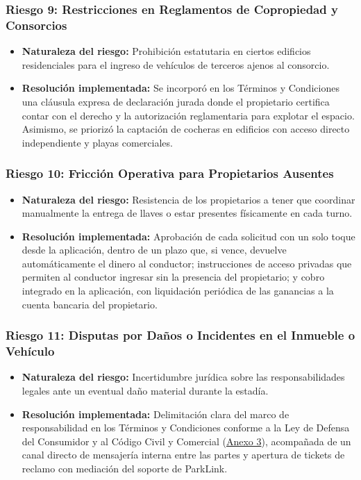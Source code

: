 \subsubsection{Riesgo 9: Restricciones en Reglamentos de Copropiedad y Consorcios}
\begin{itemize}
    \item \textbf{Naturaleza del riesgo:} Prohibición estatutaria en ciertos edificios residenciales para el ingreso de vehículos de terceros ajenos al consorcio.
    \item \textbf{Resolución implementada:} Se incorporó en los Términos y Condiciones una cláusula expresa de declaración jurada donde el propietario certifica contar con el derecho y la autorización reglamentaria para explotar el espacio. Asimismo, se priorizó la captación de cocheras en edificios con acceso directo independiente y playas comerciales.
\end{itemize}

\subsubsection{Riesgo 10: Fricción Operativa para Propietarios Ausentes}
\begin{itemize}
    \item \textbf{Naturaleza del riesgo:} Resistencia de los propietarios a tener que coordinar manualmente la entrega de llaves o estar presentes físicamente en cada turno.
    \item \textbf{Resolución implementada:} Aprobación de cada solicitud con un solo toque desde la aplicación, dentro de un plazo que, si vence, devuelve automáticamente el dinero al conductor; instrucciones de acceso privadas que permiten al conductor ingresar sin la presencia del propietario; y cobro integrado en la aplicación, con liquidación periódica de las ganancias a la cuenta bancaria del propietario.
\end{itemize}

\subsubsection{Riesgo 11: Disputas por Daños o Incidentes en el Inmueble o Vehículo}
\begin{itemize}
    \item \textbf{Naturaleza del riesgo:} Incertidumbre jurídica sobre las responsabilidades legales ante un eventual daño material durante la estadía.
    \item \textbf{Resolución implementada:} Delimitación clara del marco de responsabilidad en los Términos y Condiciones conforme a la Ley de Defensa del Consumidor y al Código Civil y Comercial (\hyperref[anexo:legal]{Anexo 3}), acompañada de un canal directo de mensajería interna entre las partes y apertura de tickets de reclamo con mediación del soporte de ParkLink.
\end{itemize}

